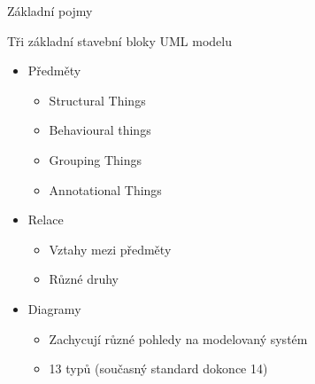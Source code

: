 \begin{frame}{Základní pojmy}

 Tři základní stavební bloky UML modelu

\begin{itemize}
	\item Předměty
	
	\begin{itemize}
		\item Structural Things
		\item Behavioural things
		\item Grouping Things
		\item Annotational Things
	\end{itemize}
	
	\item Relace
	\onslide<6->
	\begin{itemize}
		\item Vztahy mezi předměty
		\item Různé druhy
	\end{itemize}
	
	\item Diagramy
	\onslide<7->
	\begin{itemize}
		\item Zachycují různé pohledy na modelovaný systém
		\item 13 typů (současný standard dokonce 14)
	\end{itemize}
\end{itemize}

\end{frame}


